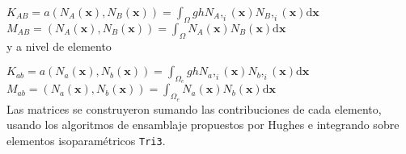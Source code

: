 $K_{AB} = a(N_A(\boldsymbol{x}), N_B(\boldsymbol{x})) = \int_{\Omega} gh N_A,_i(\boldsymbol{x}) N_B,_i(\boldsymbol{x}) \mathrm{d}\boldsymbol{x} $\\

$M_{AB} = (N_A(\boldsymbol{x}), N_B(\boldsymbol{x})) = \int_{\Omega} N_A(\boldsymbol{x}) N_B(\boldsymbol{x}) \mathrm{d}\boldsymbol{x} $\\

y a  nivel de elemento

$K_{ab} = a(N_a(\boldsymbol{x}), N_b(\boldsymbol{x})) = \int_{\Omega_e} gh N_a,_i(\boldsymbol{x}) N_b,_i(\boldsymbol{x}) \mathrm{d}\boldsymbol{x} $\\

$M_{ab} = (N_a(\boldsymbol{x}), N_b(\boldsymbol{x})) = \int_{\Omega_e} N_a(\boldsymbol{x}) N_b(\boldsymbol{x}) \mathrm{d}\boldsymbol{x} $\\

Las matrices se construyeron sumando las contribuciones de cada elemento, usando los algoritmos de ensamblaje propuestos por Hughes \cite{hughes2000} e integrando sobre elementos isoparam\'etricos \verb;Tri3;. 







